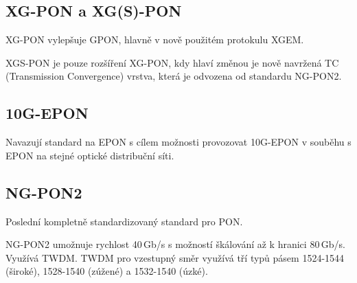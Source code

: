 \subsection{XG-PON a XG(S)-PON}

XG-PON vylepšuje GPON, hlavně v nově použitém protokulu XGEM.

XGS-PON je pouze rozšíření XG-PON, kdy hlaví změnou je nově navržená TC (Transmission Convergence) vrstva, která je odvozena od standardu NG-PON2.

\subsection{10G-EPON}

Navazují standard na EPON s cílem možnosti provozovat 10G-EPON v souběhu s EPON na stejné optické distribuční síti.

\subsection{NG-PON2}
Poslední kompletně standardizovaný standard pro PON.

NG-PON2 umožnuje rychlost 40\,Gb/s s možností škálování až k hranici 80\,Gb/s. Využívá TWDM. TWDM pro vzestupný směr využívá tří typů pásem 1524-1544 (široké), 1528-1540 (zúžené) a 1532-1540 (úzké).

